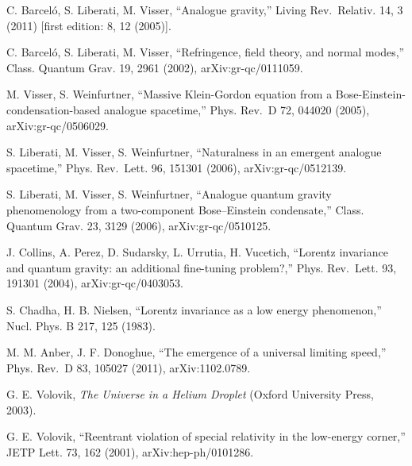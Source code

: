 \documentclass[
  11pt,
]{article}
\begin{document}
\begingroup\small\begin{list}{}{\setlength{\leftmargin}{2.5em}\setlength{\labelwidth}{2.2em}\setlength{\labelsep}{0.3em}\setlength{\itemsep}{1pt}\setlength{\parsep}{0pt}\setlength{\topsep}{2pt}}

\item[{[1]}] C. Barceló, S. Liberati, M. Visser, ``Analogue gravity,''
Living Rev.~Relativ. 14, 3 (2011) {[}first edition: 8, 12 (2005){]}.

\item[{[2]}] C. Barceló, S. Liberati, M. Visser, ``Refringence, field
theory, and normal modes,'' Class. Quantum Grav. 19, 2961 (2002),
arXiv:gr-qc/0111059.

\item[{[3]}] M. Visser, S. Weinfurtner, ``Massive Klein-Gordon equation
from a Bose-Einstein-condensation-based analogue spacetime,'' Phys.
Rev.~D 72, 044020 (2005), arXiv:gr-qc/0506029.

\item[{[4]}] S. Liberati, M. Visser, S. Weinfurtner, ``Naturalness in an
emergent analogue spacetime,'' Phys. Rev.~Lett. 96, 151301 (2006),
arXiv:gr-qc/0512139.

\item[{[5]}] S. Liberati, M. Visser, S. Weinfurtner, ``Analogue quantum
gravity phenomenology from a two-component Bose--Einstein condensate,''
Class. Quantum Grav. 23, 3129 (2006), arXiv:gr-qc/0510125.

\item[{[6]}] J. Collins, A. Perez, D. Sudarsky, L. Urrutia, H. Vucetich,
``Lorentz invariance and quantum gravity: an additional fine-tuning
problem?,'' Phys. Rev.~Lett. 93, 191301 (2004), arXiv:gr-qc/0403053.

\item[{[7]}] S. Chadha, H. B. Nielsen, ``Lorentz invariance as a low
energy phenomenon,'' Nucl. Phys. B 217, 125 (1983).

\item[{[8]}] M. M. Anber, J. F. Donoghue, ``The emergence of a universal
limiting speed,'' Phys. Rev.~D 83, 105027 (2011), arXiv:1102.0789.

\item[{[9]}] G. E. Volovik, \emph{The Universe in a Helium Droplet}
(Oxford University Press, 2003).

\item[{[10]}] G. E. Volovik, ``Reentrant violation of special relativity
in the low-energy corner,'' JETP Lett. 73, 162 (2001),
arXiv:hep-ph/0101286.


\end{list}
\end{document}
